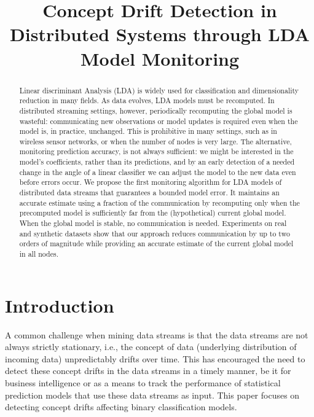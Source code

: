 \documentclass[11pt,twocolumn,varwidth=true,a4paper,fleqn]{article}
\begin{document}
\nocite{*}

\title{Concept Drift Detection in Distributed Systems through LDA
Model Monitoring}
\date{}
\maketitle

\begin{abstract}
Linear discriminant Analysis (LDA) is widely used for classification and
dimensionality reduction in many fields. As data evolves, LDA models must be recomputed. 
In distributed streaming settings, however, periodically recomputing the global model is
wasteful: communicating new observations or model updates is required even when the model 
is, in practice, unchanged.
This is prohibitive in many settings, such as in wireless sensor
networks, or when the number of nodes is very large. The
alternative, monitoring prediction accuracy, is not always
sufficient: we might be interested in the model's coefficients, rather than its
predictions, and by an early detection of a needed change in the angle of
a linear classifier we can adjust the model to the new data even before errors
occur.
We propose the first monitoring algorithm for LDA
models of distributed data streams that guarantees a bounded model error. 
It maintains an accurate estimate using a fraction of the communication by recomputing only
when the precomputed model is sufficiently far from the
(hypothetical) current global model. When the global model
is stable, no communication is needed.
Experiments on real and synthetic datasets show that
our approach reduces communication by up to two orders
of magnitude while providing an accurate estimate of the
current global model in all nodes.
\end{abstract}

\section{Introduction}
A common challenge when mining data streams is that
the data streams are not always strictly stationary, i.e., the
concept of data (underlying distribution of incoming data)
unpredictably drifts over time. This has encouraged the need
to detect these concept drifts in the data streams in a timely
manner, be it for business intelligence or as a means to track
the performance of statistical prediction models that use these
data streams as input. This paper focuses on detecting concept drifts affecting
binary classification models.
\end{document}
